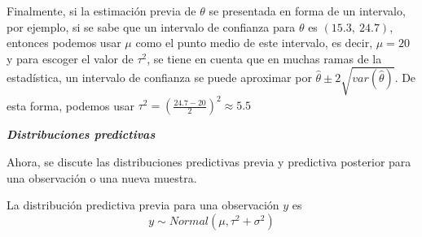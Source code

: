     Finalmente, si la estimaci\'on previa de $\theta$ se presentada en forma de un intervalo, por ejemplo, si se sabe que un intervalo de confianza para $\theta$ es $(15.3,\ 24.7)$, entonces podemos usar $\mu$ como el punto medio de este intervalo, es decir, $\mu=20$ y para escoger el valor de $\tau^2$, se tiene en cuenta que en muchas ramas de la estad\'istica, un intervalo de confianza se puede aproximar por $\hat{\theta}\pm 2\sqrt{var(\hat{\theta})}$. De esta forma, podemos usar $\tau^2=\left(\frac{24.7-20}{2}\right)^2\approx5.5$
    
    \textbf{\emph{Distribuciones predictivas}}
    
    Ahora, se discute las distribuciones predictivas previa y predictiva posterior para una observaci\'on o una nueva muestra.
    
    \begin{Res}
    La distribuci\'on predictiva previa para una observaci\'on $y$ es
    \begin{equation*}
    y \sim Normal (\mu, \tau^2+\sigma^2)
    \end{equation*}
    \end{Res}
    
